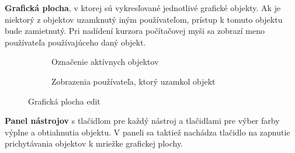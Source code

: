 \textbf{Grafická plocha}, v ktorej sú vykresľované jednotlivé grafické objekty. Ak je niektorý z objektov uzamknutý iným používateľom, prístup k tomuto objektu bude zamietnutý. Pri nadídení kurzora počítačovej myši sa zobrazí meno používateľa používajúceho daný objekt.
\begin{figure}[H]
	\centering
	\begin{subfigure}[t]{0.48\linewidth}	
		\caption{Označenie aktívnych objektov}
	\end{subfigure}
	\quad
	\begin{subfigure}[t]{0.48\linewidth}	
		\caption{Zobrazenia používateľa, ktorý uzamkol objekt}
	\end{subfigure}
	
	\caption{Grafická plocha edit}
\end{figure}

 \textbf{Panel nástrojov} s tlačidlom pre každý nástroj a tlačidlami pre výber farby výplne a obtiahnutia objektu. V paneli sa taktiež nachádza tlačidlo na zapnutie prichytávania objektov k mriežke grafickej plochy.
	
